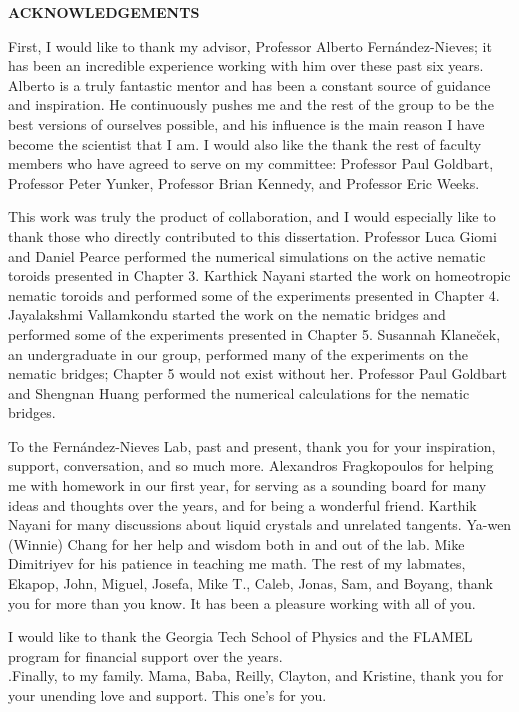 \clearpage
\begin{centering}
\textbf{ACKNOWLEDGEMENTS}\\
\vspace{\baselineskip}
\end{centering}

First, I would like to thank my advisor, Professor Alberto Fern\'andez-Nieves; it has been an incredible experience working with him over these past six years.
Alberto is a truly fantastic mentor and has been a constant source of guidance and inspiration.
He continuously pushes me and the rest of the group to be the best versions of ourselves possible, and his influence is the main reason I have become the scientist that I am.
I would also like the thank the rest of faculty members who have agreed to serve on my committee: Professor Paul Goldbart, Professor Peter Yunker, Professor Brian Kennedy, and Professor Eric Weeks.

This work was truly the product of collaboration, and I would especially like to thank those who directly contributed to this dissertation.
Professor Luca Giomi and Daniel Pearce performed the numerical simulations on the active nematic toroids presented in Chapter 3.
Karthick Nayani started the work on homeotropic nematic toroids and performed some of the experiments presented in Chapter 4.
Jayalakshmi Vallamkondu started the work on the nematic bridges and performed some of the experiments presented in Chapter 5.
Susannah Klane\u{c}ek, an undergraduate in our group, performed many of the experiments on the nematic bridges; Chapter 5 would not exist without her.
Professor Paul Goldbart and Shengnan Huang performed the numerical calculations for the nematic bridges.

To the Fern\'andez-Nieves Lab, past and present, thank you for your inspiration, support, conversation, and so much more.
Alexandros Fragkopoulos for helping me with homework in our first year, for serving as a sounding board for many ideas and thoughts over the years, and for being a wonderful friend.
Karthik Nayani for many discussions about liquid crystals and unrelated tangents.
Ya-wen (Winnie) Chang for her help and wisdom both in and out of the lab.
Mike Dimitriyev for his patience in teaching me math.
The rest of my labmates, Ekapop, John, Miguel, Josefa, Mike T., Caleb, Jonas, Sam, and Boyang, thank you for more than you know.
It has been a pleasure working with all of you.

I would like to thank the Georgia Tech School of Physics and the FLAMEL program for financial support over the years.\\

\noindent.Finally, to my family.
Mama, Baba, Reilly, Clayton, and Kristine, thank you for your unending love and support.
This one's for you.

\clearpage
